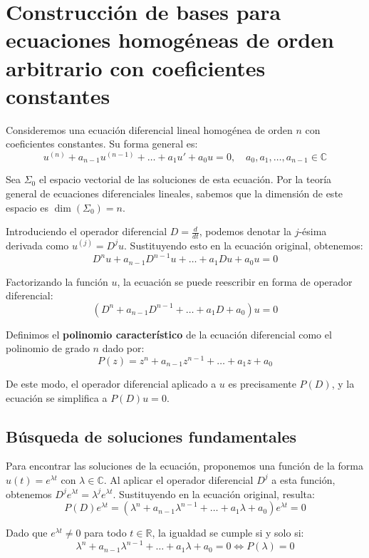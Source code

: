 ﻿\section{Construcción de bases para ecuaciones homogéneas de orden arbitrario con coeficientes constantes}

Consideremos una ecuación diferencial lineal homogénea de orden $n$ con coeficientes constantes. Su forma general es:
\[
    u^{(n)} + a_{n-1} u^{(n-1)} + \dots + a_1 u' + a_0 u = 0, \quad a_0, a_1, \dots, a_{n-1} \in \mathbb{C}
\]

Sea $\Sigma_0$ el espacio vectorial de las soluciones de esta ecuación. Por la teoría general de ecuaciones diferenciales lineales, sabemos que la dimensión de este espacio es $\dim(\Sigma_0) = n$. 

Introduciendo el operador diferencial $D = \frac{d}{dt}$, podemos denotar la $j$-ésima derivada como $u^{(j)} = D^j u$. Sustituyendo esto en la ecuación original, obtenemos:
\[
    D^n u + a_{n-1} D^{n-1} u + \dots + a_1 D u + a_0 u = 0
\]

Factorizando la función $u$, la ecuación se puede reescribir en forma de operador diferencial:
\[
    (D^n + a_{n-1} D^{n-1} + \dots + a_1 D + a_0) u = 0
\]

Definimos el \textbf{polinomio característico} de la ecuación diferencial como el polinomio de grado $n$ dado por:
\[
    P(z) = z^n + a_{n-1} z^{n-1} + \dots + a_1 z + a_0
\]

De este modo, el operador diferencial aplicado a $u$ es precisamente $P(D)$, y la ecuación se simplifica a $P(D)u = 0$.

\subsection{Búsqueda de soluciones fundamentales}

Para encontrar las soluciones de la ecuación, proponemos una función de la forma $u(t) = e^{\lambda t}$ con $\lambda \in \mathbb{C}$. Al aplicar el operador diferencial $D^j$ a esta función, obtenemos $D^j e^{\lambda t} = \lambda^j e^{\lambda t}$. Sustituyendo en la ecuación original, resulta:
\[
    P(D)e^{\lambda t} = (\lambda^n + a_{n-1} \lambda^{n-1} + \dots + a_1 \lambda + a_0) e^{\lambda t} = 0
\]

Dado que $e^{\lambda t} \neq 0$ para todo $t \in \mathbb{R}$, la igualdad se cumple si y solo si:
\[
    \lambda^n + a_{n-1} \lambda^{n-1} + \dots + a_1 \lambda + a_0 = 0 \iff P(\lambda) = 0
\]

